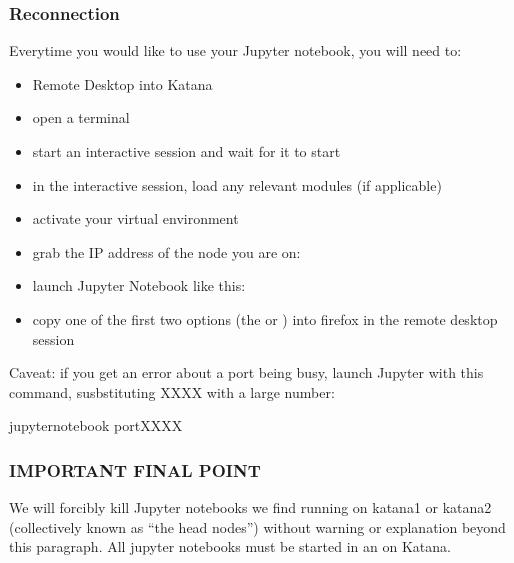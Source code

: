 \documentclass[letterpaper,10pt,english]{sphinxmanual}
\begin{document}
\subsubsection{Reconnection}
\label{\detokenize{software/python-jupyter-notebooks:reconnection}}
Everytime you would like to use your Jupyter notebook, you will need to:
\begin{itemize}
\item {} 
Remote Desktop into Katana

\item {} 
open a terminal

\item {} 
start an interactive session \sphinxhyphen{}  \sphinxhyphen{} and wait for it to start

\item {} 
in the interactive session, load any relevant modules (if applicable)

\item {} 
activate your virtual environment

\item {} 
grab the IP address of the node you are on: 

\item {} 
launch Jupyter Notebook like this: 

\item {} 
copy one of the first two options (the  or ) into firefox in the remote desktop session

\end{itemize}

Caveat: if you get an error about a port being busy, launch Jupyter with this command, susbstituting XXXX with a large number:

\begin{sphinxVerbatim}[commandchars=\\\{\}]
jupyter\PYGZhy{}notebook \PYGZhy{}\PYGZhy{}portXXXX
\end{sphinxVerbatim}


\subsubsection{IMPORTANT FINAL POINT}
\label{\detokenize{software/python-jupyter-notebooks:important-final-point}}
We will forcibly kill Jupyter notebooks we find running on katana1 or katana2 (collectively known as “the head nodes”) without warning or explanation beyond this paragraph. All jupyter notebooks must be started in an {\hyperref[\detokenize{using_katana/running_jobs:interactive-session}]{}} on Katana.
\end{document}
